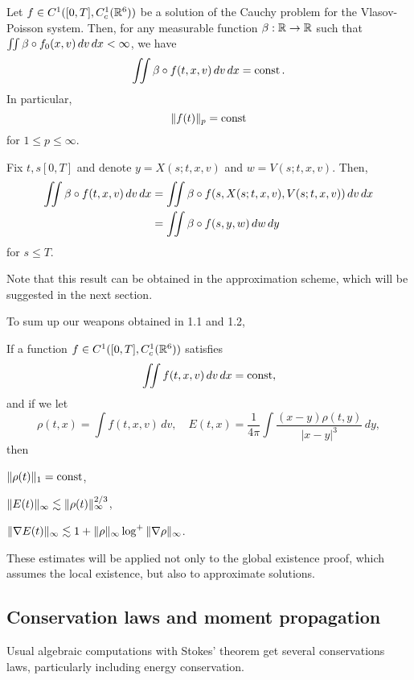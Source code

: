 \documentclass[11pt]{amsart}
\begin{document}
\begin{cor}
Let $f\in C^1([0,T],C_c^1(\mathbb{R}^6))$ be a solution of the Cauchy problem for the Vlasov-Poisson system.
Then, for any measurable function $\beta:\R\to\R$ such that $\iint\beta\o f_0(x,v)\,dv\,dx<\infty$, we have
\[\iint\beta\o f(t,x,v)\,dv\,dx=\const.\]
In particular,
\[\|f(t)\|_p=\operatorname{const}\]
for $1\le p\le\infty$.
\end{cor}
\begin{pf}
Fix $t,s[0,T]$ and denote $y=X(s;t,x,v)$ and $w=V(s;t,x,v)$.
Then,
\begin{align*}
\iint\beta\o f(t,x,v)\,dv\,dx
&=\iint\beta\o f(s,X(s;t,x,v),V(s;t,x,v))\,dv\,dx\\
&=\iint\beta\o f(s,y,w)\,dw\,dy
\end{align*}
for $s\le T$.
\end{pf}
\begin{rmk}
Note that this result can be obtained in the approximation scheme, which will be suggested in the next section.
\end{rmk}

To sum up our weapons obtained in 1.1 and 1.2,
\begin{cor}
If a function $f\in C^1([0,T],C_c^1(\mathbb{R}^6))$ satisfies
\[\iint f(t,x,v)\,dv\,dx=\operatorname{const},\]
and if we let
\[\rho(t,x)=\int f(t,x,v)\,dv,\quad E(t,x)=\frac1{4\pi}\int\frac{(x-y)\rho(t,y)}{|x-y|^3}\,dy,\]
then
\begin{cond}
\item $\|\rho(t)\|_1=\operatorname{const}$,
\item $\|E(t)\|_\infty\lesssim\|\rho(t)\|_\infty^{2/3}$,
\item $\|\nabla E(t)\|_\infty\lesssim1+\|\rho\|_\infty\log^+\|\nabla\rho\|_\infty$.
\end{cond}
\end{cor}
These estimates will be applied not only to the global existence proof, which assumes the local existence, but also to approximate solutions.



\subsection{Conservation laws and moment propagation}
Usual algebraic computations with Stokes' theorem get several conservations laws, particularly including energy conservation.
\end{document}
